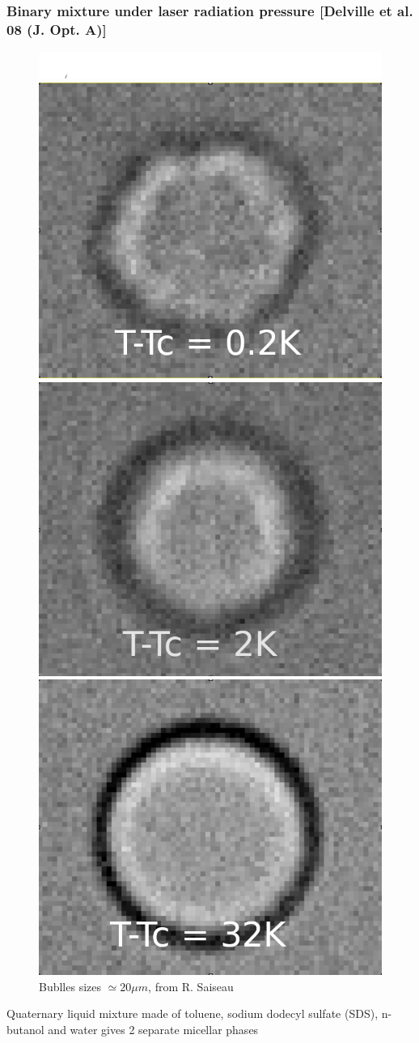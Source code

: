 \documentclass[9pt, dvipsnames,aspectratio=169]{beamer} %
\begin{document}
\begin{frame}
    \frametitle{Binary mixture under laser radiation pressure [Delville et al. 08 (J. Opt. A)]}
    \centering
    \begin{figure}
    	\includegraphics[width=\linewidth]{Phantom_38,0cmnew_obj_x20OlyFLN_fps_1000_10K_bkup_3,2mum--00.png} \\    
    	\includegraphics[width=0.3\linewidth]{02_K_70x60_70,5cm.png}
    	\includegraphics[width=0.3\linewidth]{2_K_70x60_69,4cm.png}
    	\includegraphics[width=0.3\linewidth]{32_K_70x60_71,0cm.png}  \\
    	{\footnotesize Bublles sizes $\simeq 20\mu m$, from R. Saiseau}  	    	
    \end{figure}
    {\small Quaternary liquid mixture made of toluene, sodium dodecyl sulfate (SDS), n-butanol and water gives 2 separate micellar phases } \\
\end{frame}
\end{document}
